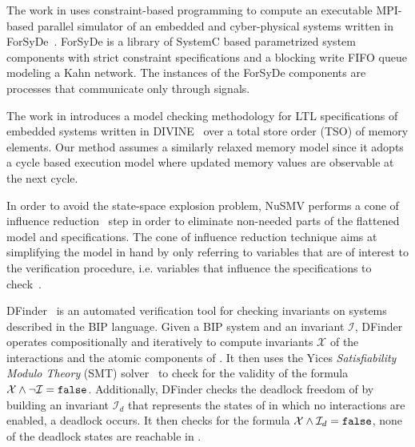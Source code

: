    

The work in \cite{NiakiDATAS13} uses constraint-based
programming to compute an executable 
MPI-based parallel simulator of an embedded and cyber-physical 
systems written in ForSyDe~\cite{SanderJ04}.
ForSyDe is a library of SystemC based 
parametrized system components with strict constraint 
specifications and a blocking write FIFO queue modeling 
a Kahn network. 
The instances of the ForSyDe components are processes that 
communicate only through signals. 

The work in \cite{BarnatVMCAI2013} introduces a model checking
methodology for LTL specifications of embedded systems written 
in DIVINE~\cite{Divine}  over
a total store order (TSO) of memory elements. 
Our method assumes a similarly relaxed memory model
since it adopts a cycle based execution model where 
updated memory values are observable at the next cycle. 

In order to avoid the state-space explosion problem, NuSMV performs a cone of 
influence reduction~\cite{berezin1998compositional} step in order to eliminate
non-needed parts of the flattened model and specifications. The cone of influence
reduction technique aims at simplifying the model in hand by only 
referring to variables that are of interest to the verification procedure, i.e. variables
that influence the specifications to check~\cite{clarke1999model}.

DFinder~\cite{dfinder} is an automated verification tool for checking invariants
on systems described in the BIP language. Given a BIP system \Pm and 
an invariant $\mathcal{I}$, DFinder operates  compositionally and iteratively
to compute invariants $\mathcal{X}$ of the interactions and the atomic 
components of \Pm. It then uses the Yices {\em Satisfiability Modulo
Theory} (SMT) solver~\cite{dutertre2006fast} to check for the validity 
of the formula $\mathcal{X} \land \lnot \mathcal{I} = \mathtt{false}$. 
Additionally, DFinder checks the deadlock freedom of  \Pm by building an invariant 
$\mathcal{I}_d$ that represents the states of \Pm in which no interactions 
are enabled, \ie{} a deadlock occurs. It then checks for the formula
$\mathcal{X} \land \mathcal{I}_d = \mathtt{false}$, \ie{} none of the deadlock states
are reachable in \Pm.   

